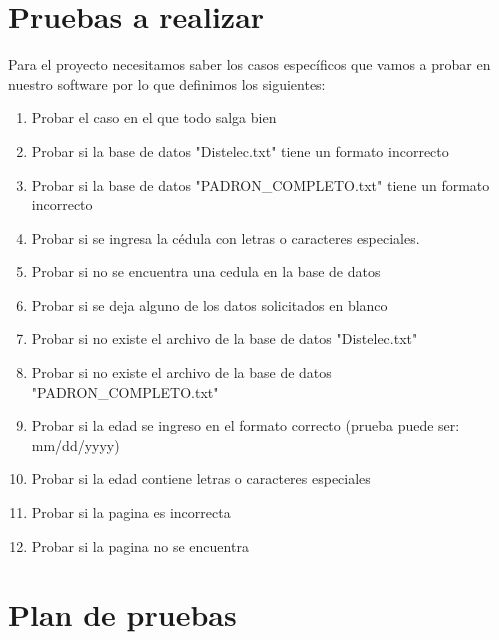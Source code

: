 \documentclass[conference]{IEEEtran}
\begin{document}
\section{Pruebas a realizar}

Para el proyecto necesitamos saber los casos específicos que vamos a probar en nuestro software por lo que definimos los siguientes:

\begin{enumerate}

\item Probar el caso en el que todo salga bien

\item Probar si la base de datos "Distelec.txt" tiene un formato incorrecto

\item Probar si la base de datos "PADRON\_COMPLETO.txt" tiene un formato incorrecto

\item Probar si se ingresa la cédula con letras o caracteres especiales.

\item Probar si no se encuentra una cedula en la base de datos

\item Probar si se deja alguno de los datos solicitados en blanco

\item Probar si no existe el archivo de la base de datos "Distelec.txt"

\item Probar si no existe el archivo de la base de datos "PADRON\_COMPLETO.txt"

\item Probar si la edad se ingreso en el formato correcto (prueba puede ser: mm/dd/yyyy)

\item Probar si la edad contiene letras o caracteres especiales

\item Probar si la pagina es incorrecta 

\item Probar si la pagina no se encuentra

\end{enumerate}

\section{Plan de pruebas}
\end{document}

